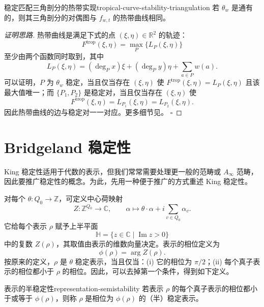 \begin{theorem}{稳定匹配三角剖分的热带实现}{tropical-curve-stability-triangulation}
若 $\theta_w$ 是通有的，则其三角剖分的对偶图与 $f_{w,t}$ 的热带曲线相同。
\end{theorem}
\begin{proof}[证明思路]
热带曲线是满足下式的点 $(\xi,\eta)\in\mathbb R^2$ 的轨迹：
\[
  F^{\mathrm{trop}}(\xi,\eta)=\max_P\{L_P(\xi,\eta)\}
\]
至少由两个函数同时取到，其中
\[
  L_P(\xi,\eta)
  =(\deg_Px)\xi+(\deg_Py)\eta+\sum_{a\in P}w(a).
\]
可以证明，$P$ 为 $\theta_w$ 稳定，当且仅当存在 $(\xi,\eta)$ 使 $F^{\mathrm{trop}}(\xi,\eta)=L_P(\xi,\eta)$ 且该最大值唯一；而 $\{P_1,P_2\}$ 是稳定对，当且仅当存在 $(\xi,\eta)$ 使
\[
  F^{\mathrm{trop}}(\xi,\eta)=L_{P_1}(\xi,\eta)=L_{P_2}(\xi,\eta).
\]
因此热带曲线的边与稳定对一一对应。更多细节见。
\hfill$\square$
\end{proof}


\section{Bridgeland 稳定性}\label{sec:bridgeland-stability}

King 稳定性适用于代数的表示，但我们常常需要处理更一般的范畴或 $A_\infty$ 范畴，因此要推广稳定性的概念。为此，先用一种便于推广的方式重述 King 稳定性。

对每个 $\theta\colon Q_0\to\mathbb Z$，可定义中心荷映射
\[
  Z\colon\mathbb Z^{Q_0}\longrightarrow\mathbb C,\qquad
  \alpha\longmapsto\theta\cdot\alpha+i\sum_{v\in Q_0}\alpha_v.
\]
它给每个表示 $\rho$ 赋予上半平面
\[
  \mathbb H=\{z\in\mathbb C\mid\operatorname{Im}z>0\}
\]
中的复数 $Z(\rho)$，其取值由表示的维数向量决定。表示的相位定义为
\[
  \phi(\rho)=\arg Z(\rho).
\]
按原来的定义，$\rho$ 是 $\theta$ 稳定表示，当且仅当：(i) 它的相位为 $\pi/2$；(ii) 每个真子表示的相位都小于 $\rho$ 的相位。因此，可以去掉第一个条件，得到如下定义。

\begin{definition}{表示的半稳定性}{representation-semistability}
若表示 $\rho$ 的每个真子表示的相位都小于或等于 $\phi(\rho)$，则称 $\rho$ 是相位为 $\phi(\rho)$ 的（半）稳定表示。
\end{definition}

